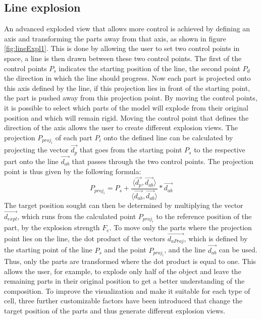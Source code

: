 \subsection{Line explosion} 
\label{lineExp}
An advanced exploded view that allows more control is achieved by defining an axis and transforming the parts away from that axis, as shown in figure \ref{fig:lineExpl1}.
This is done by allowing the user to set two control points in space, a line is then drawn between these two control points. 
The first of the control points $P_s$ indicates the starting position of the line, the second point $P_d$ the direction in which the line should progress. 
Now each part is projected onto this axis defined by the line, if this projection lies in front of the starting point, the part is pushed away from this projection point. 
By moving the control points, it is possible to select which parts of the model will explode from their original position and which will remain rigid. 
Moving the control point that defines the direction of the axis allows the user to create different explosion views.
The projection $P_{proj_i}$ of each part $P_i$ onto the defined line can be calculated by projecting the vector $\vec{d_p}$ that goes from the starting point $P_s$ to the respective part onto the line $\vec{d_{ab}}$ that passes through the two control points. 
The projection point is thus given by the following formula:
\begin{equation}
	P_{proj_i} = P_s + \frac{\langle\vec{d_p},\vec{d_{ab}}\rangle}{\langle\vec{d_{ab}},\vec{d_{ab}}\rangle} * \vec{d_{ab}}
	\label{eq:LineProj}
\end{equation}
The target position sought can then be determined by multiplying the vector $\vec{d_{expl}}$, which runs from the calculated point $P_{proj_i}$ to the reference position of the part, by the explosion strength $F_e$.
To move only the parts where the projection point lies on the line, the dot product of the vectors $\vec{d_{aProj}}$, which is defined by the starting point of the line $P_s$ and the point $P_{proj_i}$, and the line $\vec{d_{ab}}$ can be used. Thus, only the parts are transformed where the dot product is equal to one.
This allows the user, for example, to explode only half of the object and leave the remaining parts in their original position to get a better understanding of the composition. 
To improve the visualization and make it suitable for each type of cell, three further customizable factors have been introduced that change the target position of the parts and thus generate different explosion views. 
